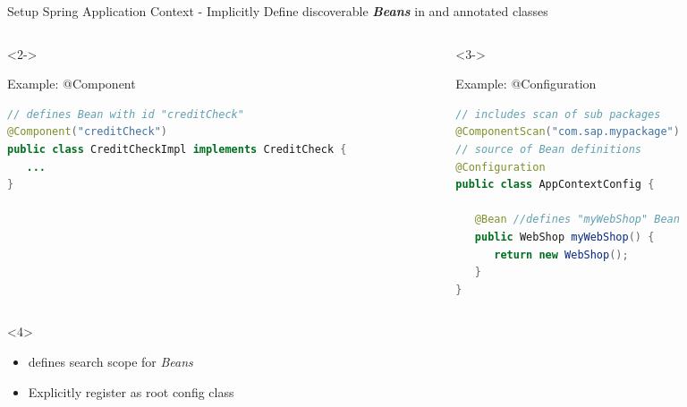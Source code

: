\begin{frame}[fragile]{Setup Spring Application Context - Implicitly}
Define discoverable \textbf{\emph{Beans}} in \textbf{} and \textbf{} annotated classes
\begin{columns}
\begin{column}[T]{.47\textwidth}
\begin{visibleenv}<2->
\begin{block}{Example: @Component}
\begin{lstlisting}[language=Java]
// defines Bean with id "creditCheck"
@Component("creditCheck") 
public class CreditCheckImpl implements CreditCheck {
   ...
}
\end{lstlisting}	
\end{block}
\end{visibleenv}
\end{column}
\begin{column}[T]{.47\textwidth}
\begin{visibleenv}<3->
\begin{block}{Example: @Configuration}
\begin{lstlisting}[language=Java,belowskip=0mm,aboveskip=0mm]
// includes scan of sub packages
@ComponentScan("com.sap.mypackage") 
// source of Bean definitions
@Configuration
public class AppContextConfig {
	
   @Bean //defines "myWebShop" Bean
   public WebShop myWebShop() {
      return new WebShop();
   }
}
\end{lstlisting}
\end{block}
\end{visibleenv}
\end{column}
\end{columns}
\begin{visibleenv}<4>
\begin{itemize}
     \item \textbf{} defines search scope for \emph{Beans}
	\item Explicitly register  as root config class
\end{itemize}
\end{visibleenv}
\end{frame}


